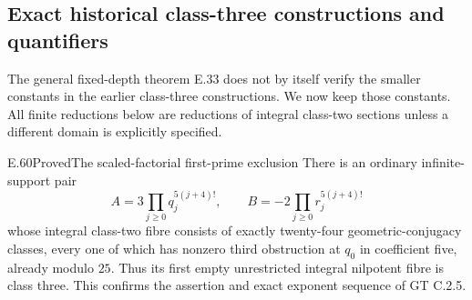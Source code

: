 \subsection{Exact historical class-three constructions and quantifiers}

The general fixed-depth theorem E.33 does not by itself verify
the smaller constants in the earlier class-three constructions.
We now keep those constants. All finite reductions below are
reductions of integral class-two sections unless a different
domain is explicitly specified.

\begin{result}{E.60}{Proved}{The scaled-factorial first-prime exclusion}
\label{coh:scaled-five}
There is an ordinary infinite-support pair
\[
 A=3\prod_{j\geq0}q_j^{5(j+4)!},\qquad
 B=-2\prod_{j\geq0}r_j^{5(j+4)!}
\]
whose integral class-two fibre consists of exactly twenty-four
geometric-conjugacy classes, every one of which has nonzero
third obstruction at $q_0$ in coefficient five, already
modulo $25$. Thus its first empty unrestricted integral
nilpotent fibre is class three. This confirms the assertion
and exact exponent sequence of GT C.2.5.
\end{result}
